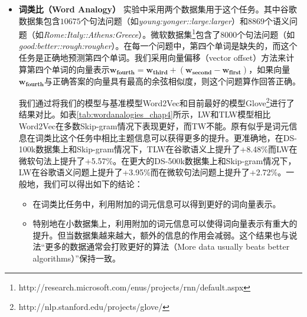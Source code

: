 \documentclass[master]{njuthesis}
\begin{document}
\begin{itemize}
\item \textbf{词类比（Word Analogy）} 实验中采用两个数据集用于这个任务。其中谷歌数据集\cite{mikolov2013distributed}包含$10675$个句法问题（如{\em young:yonger::large:larger}）和$8869$个语义问题（如{\em Rome:Italy::Athens:Greece}）。微软数据集\cite{mikolov2013linguistic}\footnote{http://research.microsoft.com/enus/projects/rnn/default.aspx}包含了$8000$个句法问题（如{\em good:better::rough:rougher}）。在每一个问题中，第四个单词是缺失的，而这个任务是正确地预测第四个单词。我们采用向量偏移（vector offset）方法\cite{mikolov2013distributed}来计算第四个单词的向量表示$\mathbf{w_{fourth}}=\mathbf{w_{third}}+(\mathbf{w_{second}}-\mathbf{w_{first}})$，如果向量$\mathbf{w_{fourth}}$与正确答案的向量具有最高的余弦相似度，则这个问题算作回答正确。

我们通过将我们的模型与基准模型Word2Vec\cite{mikolov2013efficient}和目前最好的模型Glove\cite{pennington2014glove}\footnote{http://nlp.stanford.edu/projects/glove/}进行了结果对比。如表\ref{tab:wordanalogies_chap4}所示，LW和TLW模型相比Word2Vec在多数Skip-gram情况下表现更好，而TW不能。原有似乎是词元信息在词类比这个任务中相比主题信息可以获得更多的提升。更准确地，在DS-100k数据集上和Skip-gram情况下，TLW在谷歌语义上提升了+8.48\%而LW在微软句法上提升了+5.57\%。在更大的DS-500k数据集上和Skip-gram情况下，LW在谷歌语义问题上提升了+3.95\%而在微软句法问题上提升了+2.72\%。一般地，我们可以得出如下的结论：

	\begin{itemize}
	\item 在词类比任务中，利用附加的词元信息可以得到更好的词向量表示。
	\item 特别地在小数据集上，利用附加的词元信息可以使得词向量表示有重大的提升。但当数据集越来越大，额外的信息的作用会减弱。这个结果也与说法“更多的数据通常会打败更好的算法（More data usually beats better algorithms\cite{rajaraman2008more}）”保持一致。
	\end{itemize}
	

\end{itemize}
\end{document}
